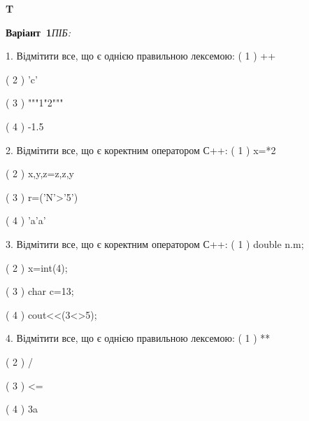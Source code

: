 \documentclass[11pt]{article}
\begin{document}
{\large\textbf{T}}

\textbf{Варіант \No\,1}\hfill \textit{ПІБ:}\,\underline{\hspace{60mm}}
\vspace{4mm}

1. %
Відмітити все, що є однією правильною лексемою:
( 1 ) ++

( 2 ) 'c'

( 3 ) """1"2"""

( 4 ) -1.5


2. %
Відмітити все, що є коректним оператором С++:
( 1 ) x=*2

( 2 ) x,y,z=z,z,y

( 3 ) r=('N'>'5')

( 4 ) 'a'a'


3. %
Відмітити все, що є коректним оператором С++:
( 1 ) double n.m;

( 2 ) x=int(4);

( 3 ) char c=13;

( 4 ) cout<<(3<>5);


4. %
Відмітити все, що є однією правильною лексемою:
( 1 ) **

( 2 ) /

( 3 ) <=

( 4 ) 3a


\newpage
\end{document}
